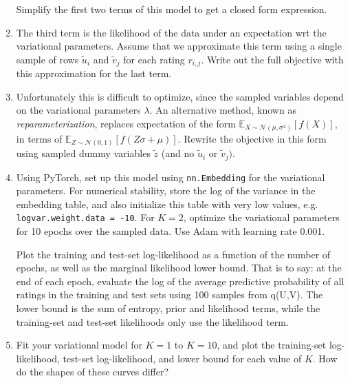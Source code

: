 \documentclass{harvardml}
\theoremstyle{plain}
\begin{document}
\begin{problem}
\begin{enumerate}
Simplify the first two terms of this model to get a closed form expression.


\item The third term is the likelihood of the data under an expectation wrt the variational parameters.
  Assume that we approximate this term using a single sample of rows $\tilde{u}_{i}$  and $\tilde{v}_{j}$
  for each rating $r_{i,j}$. Write out the full objective with this approximation for the last term.

\item  Unfortunately this is difficult to optimize, since the sampled variables 
depend on the variational parameters $\lambda$. An alternative method, known as 
\textit{reparameterization}, replaces expectation of the form 
$\mathbb{E}_{X \sim \mathcal{N}(\mu, \sigma^2)}[f(X)]$, in terms of 
$\mathbb{E}_{Z \sim \mathcal{N}(0, 1)}[f(Z \sigma + \mu)]$. Rewrite the 
objective in this form using sampled dummy variables $\tilde{z}$ 
(and no $\tilde{u}_{i}$  or $\tilde{v}_{j})$.

\item Using PyTorch, set up this model using \texttt{nn.Embedding} for the variational parameters. For numerical stability, store the log of the variance in
  the embedding table, and also initialize this table with very low values, e.g. \texttt{logvar.weight.data = -10}. 
  For $K = 2$, optimize the variational parameters for 10 epochs over the sampled data.  Use Adam with learning rate 0.001.

Plot the training and test-set log-likelihood as a function of the number of epochs, as well as the marginal likelihood lower bound.
That is to say: at the end of each epoch, evaluate the log of the average predictive probability of all ratings in the training and test sets using 100 samples from q(U,V).
The lower bound is the sum of entropy, prior and likelihood terms, while the training-set and test-set likelihoods only use the likelihood term.

\item Fit your variational model for $K = 1$ to $K = 10$, and plot the training-set log-likelihood, test-set log-likelihood, and lower bound for each value of $K$.
How do the shapes of these curves differ?



\end{enumerate}
\end{problem}
\end{document}
